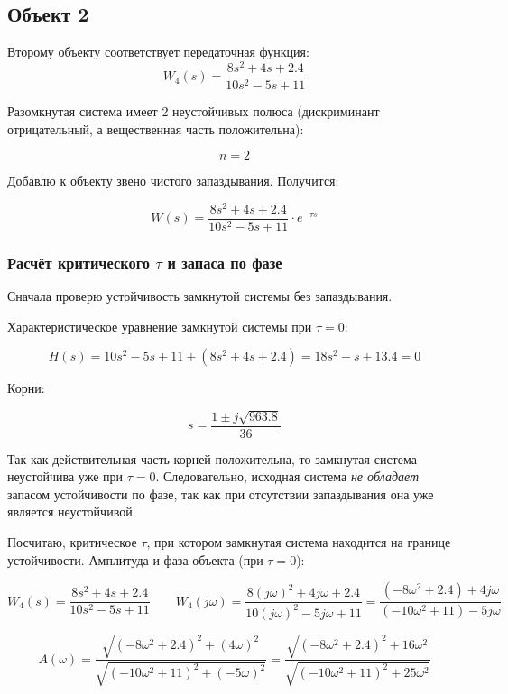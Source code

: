\documentclass[a4paper,12pt]{article}
\begin{document}
	\newpage
	\subsection{Объект 2}
	
	Второму объекту соответствует передаточная функция: \[W_4(s) = \dfrac{8s^2 + 4s + 2.4}{10s^2 - 5s + 11}\]
	
	Разомкнутая система имеет 2 неустойчивых полюса (дискриминант отрицательный, а вещественная часть положительна):
	
	\[n = 2\]
	
	Добавлю к объекту звено чистого запаздывания. Получится:  
	
	\[W(s) = \dfrac{8s^2 + 4s + 2.4}{10s^2 - 5s + 11} \cdot e^{-\tau s}\]
	
	\subsubsection{Расчёт критического \(\tau\) и запаса по фазе}
	
	Сначала проверю устойчивость замкнутой системы без запаздывания.
	
	Характеристическое уравнение замкнутой системы при \(\tau=0\):
	
	\[
	H(s) = 10s^2 -5s +11 + (8s^2 + 4s + 2.4) = 18s^2 - s + 13.4 = 0
	\]
	
	Корни:
	
	\[
	s = \frac{1 \pm j\sqrt{963.8}}{36}
	\]
	
	Так как действительная часть корней положительна, то замкнутая система неустойчива уже при \(\tau = 0\). Следовательно, исходная система \textit{не обладает} запасом устойчивости по фазе, так как при отсутствии запаздывания она уже является неустойчивой. 
	
	\medskip
	
	Посчитаю, критическое \(\tau\), при котором замкнутая система находится на границе устойчивости. Амплитуда и фаза объекта (при \(\tau = 0\)):
	
	\[W_4(s) = \dfrac{8s^2 + 4s + 2.4}{10s^2 - 5s + 11} \qquad W_4(j \omega) = \dfrac{ 8(j \omega)^2 + 4j \omega + 2.4}{ 10(j \omega)^2 -5j \omega + 11 } 
	= \dfrac{ (-8 \omega^2 + 2.4) +4j \omega}{ (-10 \omega^2 + 11) -5j \omega } \]
	
	\[A(\omega) = \dfrac{ \sqrt{(-8 \omega^2 + 2.4)^2 + (4 \omega)^2} }{ \sqrt{ (-10 \omega^2 + 11)^2 + (-5 \omega)^2 } } = 
	\dfrac{ \sqrt{ (-8 \omega^2 + 2.4)^2 + 16\omega^2 } }{ \sqrt{ (-10 \omega^2 + 11)^2 + 25\omega^2 } }\]
	
\end{document}

